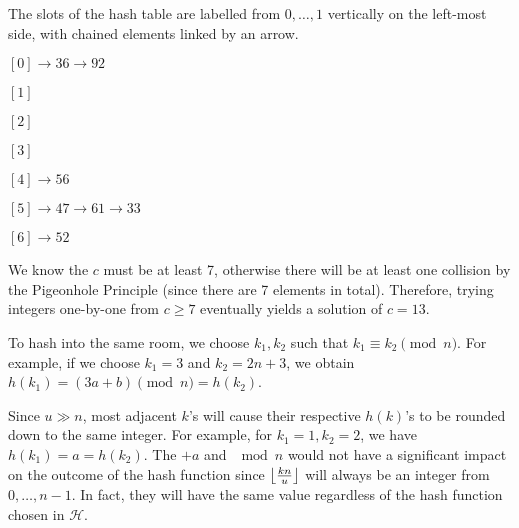 \documentclass[12pt,twoside]{article}
\begin{document}


\begin{problems}

\problem  %

\begin{problemparts}
\problempart %
The slots of the hash table are labelled from $0,\ldots,1$ vertically on the left-most side, with chained elements linked by an arrow.

$[0] \longrightarrow 36 \longrightarrow 92$

$[1]$

$[2]$

$[3]$

$[4] \longrightarrow 56$

$[5] \longrightarrow 47 \longrightarrow 61 \longrightarrow 33$

$[6] \longrightarrow 52$

\problempart %
We know the $c$ must be at least 7, otherwise there will be at least one collision by the Pigeonhole Principle (since there are 7 elements in total). Therefore, trying integers one-by-one from $c \geq 7$ eventually yields a solution of $c=13$. 

\end{problemparts}

\newpage

\problem  %

\begin{problemparts}
\problempart %
To hash into the same room, we choose $k_1, k_2$ such that $k_1 \equiv k_2 \pmod n$. For example, if we choose $k_1=3$ and $k_2=2n+3$, we obtain $h(k_1)=(3a+b)\pmod n=h(k_2)$.

\problempart %
Since $u \gg n$, most adjacent $k$'s will cause their respective $h(k)$'s to be rounded down to the same integer. For example, for $k_1=1,k_2=2$, we have $h(k_1)=a=h(k_2)$. The $+a$ and $\mod n$ would not have a significant impact on the outcome of the hash function since $\left\lfloor \frac{kn}{u} \right\rfloor$ will always be an integer from $0,\ldots,n-1$. In fact, they will have the same value regardless of the hash function chosen in $\mathcal{H}$.


\end{problemparts}
\end{problems}
\end{document}
